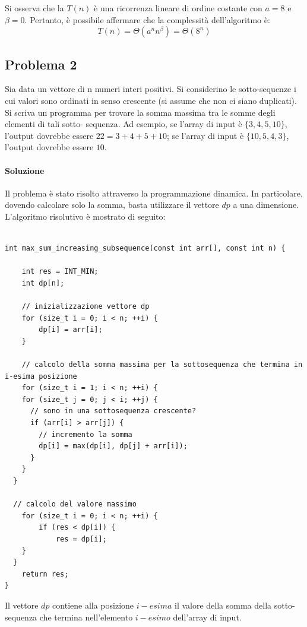 \documentclass{article}
\begin{document}
Si osserva che la $T(n)$ è una ricorrenza lineare di ordine costante con $a=8$ e $\beta = 0$. Pertanto, è possibile affermare che la complessità dell'algoritmo è:
\begin{equation*}
    T(n) = \Theta(a^n n^\beta) = \Theta(8^n)
\end{equation*}

\clearpage
\subsection{Problema 2}

Sia data un vettore di n numeri interi positivi. Si considerino le sotto-sequenze i cui valori sono ordinati in senso crescente (si assume che non ci siano duplicati). Si scriva un
programma per trovare la somma massima tra le somme degli elementi di tali sotto-
sequenza. Ad esempio, se l'array di input è $\{3, 4, 5, 10\}$, l'output dovrebbe essere $22 = 3 + 4 + 5 + 10$; se l'array di input è $\{10, 5, 4, 3\}$, l'output dovrebbe essere $10$.

\paragraph{Soluzione} Il problema è stato risolto attraverso la programmazione dinamica. In particolare, dovendo calcolare solo la somma, basta utilizzare il vettore $dp$ a una dimensione. L'algoritmo risolutivo è mostrato di seguito:

\begin{lstlisting}[caption={Calcolo della sottosequenza crescente di somma massima},captionpos=b]

int max_sum_increasing_subsequence(const int arr[], const int n) {

    int res = INT_MIN;
    int dp[n];

    // inizializzazione vettore dp
    for (size_t i = 0; i < n; ++i) {
        dp[i] = arr[i];
    }

    // calcolo della somma massima per la sottosequenza che termina in i-esima posizione
	for (size_t i = 1; i < n; ++i) {
    for (size_t j = 0; j < i; ++j) {
      // sono in una sottosequenza crescente?
      if (arr[i] > arr[j]) {
        // incremento la somma
        dp[i] = max(dp[i], dp[j] + arr[i]);
      }
    }
  }

  // calcolo del valore massimo
	for (size_t i = 0; i < n; ++i) {
		if (res < dp[i]) {
		    res = dp[i];
    }
  }
	return res;
}
\end{lstlisting}
Il vettore $dp$ contiene alla posizione $i-esima$ il valore della somma della sotto-sequenza che termina nell'elemento $i-esimo$ dell'array di input.
\end{document}
